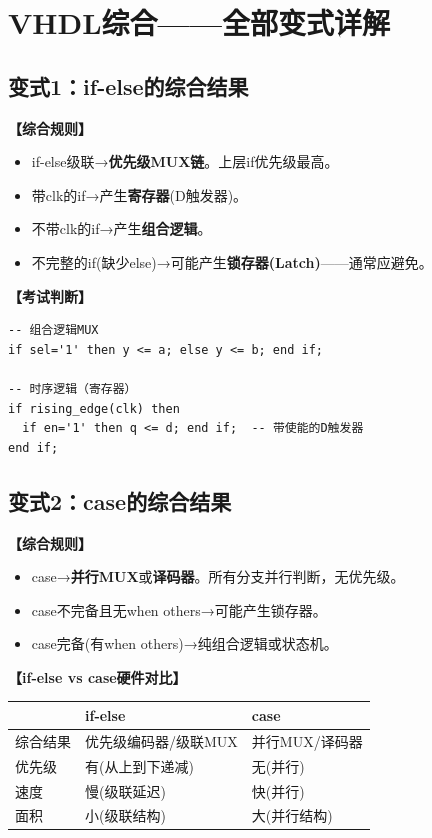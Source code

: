 \chapter{VHDL综合——全部变式详解}

\section{变式1：if-else的综合结果}

\begin{detailbox}[完整教学]
\textbf{【综合规则】}
\begin{itemize}
  \item if-else级联→\textbf{优先级MUX链}。上层if优先级最高。
  \item 带clk的if→产生\textbf{寄存器}(D触发器)。
  \item 不带clk的if→产生\textbf{组合逻辑}。
  \item 不完整的if(缺少else)→可能产生\textbf{锁存器(Latch)}——通常应避免。
\end{itemize}

\textbf{【考试判断】}
\begin{lstlisting}
-- 组合逻辑MUX
if sel='1' then y <= a; else y <= b; end if;

-- 时序逻辑（寄存器）
if rising_edge(clk) then
  if en='1' then q <= d; end if;  -- 带使能的D触发器
end if;
\end{lstlisting}
\end{detailbox}


\section{变式2：case的综合结果}

\begin{detailbox}[完整教学]
\textbf{【综合规则】}
\begin{itemize}
  \item case→\textbf{并行MUX}或\textbf{译码器}。所有分支并行判断，无优先级。
  \item case不完备且无when others→可能产生锁存器。
  \item case完备(有when others)→纯组合逻辑或状态机。
\end{itemize}

\textbf{【if-else vs case硬件对比】}
\begin{center}
\begin{tabular}{|l|l|l|}
\hline & if-else & case \\
\hline
综合结果 & 优先级编码器/级联MUX & 并行MUX/译码器 \\
优先级 & 有(从上到下递减) & 无(并行) \\
速度 & 慢(级联延迟) & 快(并行) \\
面积 & 小(级联结构) & 大(并行结构) \\
\hline
\end{tabular}
\end{center}
\end{detailbox}


